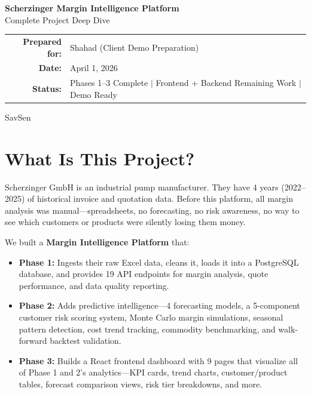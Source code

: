 \documentclass[11pt,a4paper]{article}
\begin{document}
\begin{titlepage}
\centering
\vspace*{3cm}

{\Huge\bfseries Scherzinger Margin Intelligence Platform}\\[0.8cm]
{\LARGE Complete Project Deep Dive}\\[2cm]

\begin{tabular}{rl}
\textbf{Prepared for:} & Shahad (Client Demo Preparation) \\
\textbf{Date:}         & April 1, 2026 \\
\textbf{Status:}       & Phases 1--3 Complete $\vert$ Frontend + Backend Remaining Work $\vert$ Demo Ready \\
\end{tabular}

\vfill
{\large SavSen}
\end{titlepage}

\tableofcontents
\newpage

\section{What Is This Project?}

Scherzinger GmbH is an industrial pump manufacturer. They have 4 years (2022--2025) of historical invoice and quotation data. Before this platform, all margin analysis was manual---spreadsheets, no forecasting, no risk awareness, no way to see which customers or products were silently losing them money.

We built a \textbf{Margin Intelligence Platform} that:

\begin{itemize}
  \item \textbf{Phase 1:} Ingests their raw Excel data, cleans it, loads it into a PostgreSQL database, and provides 19 API endpoints for margin analysis, quote performance, and data quality reporting.
  \item \textbf{Phase 2:} Adds predictive intelligence---4 forecasting models, a 5-component customer risk scoring system, Monte Carlo margin simulations, seasonal pattern detection, cost trend tracking, commodity benchmarking, and walk-forward backtest validation.
  \item \textbf{Phase 3:} Builds a React frontend dashboard with 9 pages that visualize all of Phase 1 and 2's analytics---KPI cards, trend charts, customer/product tables, forecast comparison views, risk tier breakdowns, and more.
\end{itemize}
\end{document}
